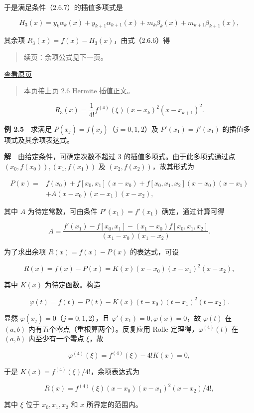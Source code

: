 \documentclass[
  10pt,
  fontset=fandol]{ctexart}
\begin{document}
于是满足条件（2.6.7）的插值多项式是

\[H_3(x)=y_k\alpha_k(x)+y_{k+1}\alpha_{k+1}(x)+m_k\beta_k(x)+m_{k+1}\beta_{k+1}(x),\tag{2.6.10}\]

其余项 \(R_3(x)=f(x)-H_3(x)\)，由式（2.6.6）得

\begin{quote}
续页：余项公式见下一页。
\end{quote}

\href{../../source-images/pdf-045.jpeg}{查看原页}

\begin{quote}
本页接上页 2.6 Hermite 插值正文。
\end{quote}

\[R_3(x)=\frac{1}{4!}f^{(4)}(\xi)(x-x_k)^2(x-x_{k+1})^2.\]

\textbf{例 2.5}　求满足 \(P(x_j)=f(x_j)\)（\(j=0,1,2\)）及 \(P'(x_1)=f'(x_1)\) 的插值多项式及其余项表达式。

\textbf{解}　由给定条件，可确定次数不超过 3 的插值多项式。由于此多项式通过点 \((x_0,f(x_0)),(x_1,f(x_1))\) 及 \((x_2,f(x_2))\)，故其形式为

\[\begin{aligned}
P(x)={}&f(x_0)+f[x_0,x_1](x-x_0)+f[x_0,x_1,x_2](x-x_0)(x-x_1)\\
&+A(x-x_0)(x-x_1)(x-x_2),
\end{aligned}\]

其中 \(A\) 为待定常数，可由条件 \(P'(x_1)=f'(x_1)\) 确定，通过计算可得

\[A=\frac{f'(x_1)-f[x_0,x_1]-(x_1-x_0)f[x_0,x_1,x_2]}{(x_1-x_0)(x_1-x_2)}.\]

为了求出余项 \(R(x)=f(x)-P(x)\) 的表达式，可设

\[R(x)=f(x)-P(x)=K(x)(x-x_0)(x-x_1)^2(x-x_2),\]

其中 \(K(x)\) 为待定函数。构造

\[\varphi(t)=f(t)-P(t)-K(x)(t-x_0)(t-x_1)^2(t-x_2).\]

显然 \(\varphi(x_j)=0\)（\(j=0,1,2\)），且 \(\varphi'(x_1)=0,\varphi(x)=0\)，故 \(\varphi(t)\) 在 \((a,b)\) 内有五个零点（重根算两个）。反复应用 Rolle 定理得，\(\varphi^{(4)}(t)\) 在 \((a,b)\) 内至少有一个零点 \(\xi\)，故

\[\varphi^{(4)}(\xi)=f^{(4)}(\xi)-4!K(x)=0,\]

于是 \(K(x)=f^{(4)}(\xi)/4!\)，余项表达式为

\[R(x)=f^{(4)}(\xi)(x-x_0)(x-x_1)^2(x-x_2)/4!,\tag{2.6.11}\]

其中 \(\xi\) 位于 \(x_0,x_1,x_2\) 和 \(x\) 所界定的范围内。
\end{document}
